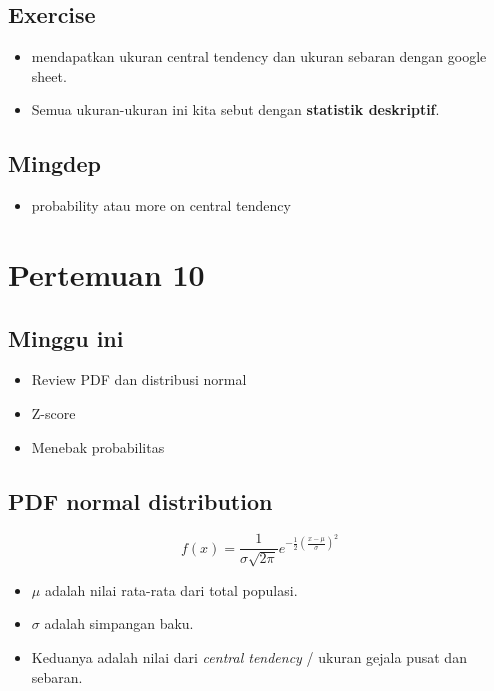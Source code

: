 \documentclass[
  letterpaper,
  DIV=11,
  numbers=noendperiod]{scrartcl}
\providecommand{\tightlist}{%
  \setlength{\itemsep}{0pt}\setlength{\parskip}{0pt}}\usepackage{longtable,booktabs,array}
\begin{document}
\subsection{Exercise}\label{exercise-1}

\begin{itemize}
\item
  mendapatkan ukuran central tendency dan ukuran sebaran dengan google
  sheet.
\item
  Semua ukuran-ukuran ini kita sebut dengan \textbf{statistik
  deskriptif}.
\end{itemize}

\subsection{Mingdep}\label{mingdep-2}

\begin{itemize}
\tightlist
\item
  probability atau more on central tendency
\end{itemize}

\section{Pertemuan 10}\label{pertemuan-10}

\subsection{Minggu ini}\label{minggu-ini-1}

\begin{itemize}
\item
  Review PDF dan distribusi normal
\item
  Z-score
\item
  Menebak probabilitas
\end{itemize}

\subsection{PDF normal distribution}\label{pdf-normal-distribution}

\[
f(x)=\frac{1}{\sigma \sqrt{2\pi}}e^{-\frac{1}{2}\left(\frac{x-\mu}{\sigma}\right)^2}
\]

\begin{itemize}
\item
  \(\mu\) adalah nilai rata-rata dari total populasi.
\item
  \(\sigma\) adalah simpangan baku.
\item
  Keduanya adalah nilai dari \emph{central tendency} / ukuran gejala
  pusat dan sebaran.
\end{itemize}
\end{document}
